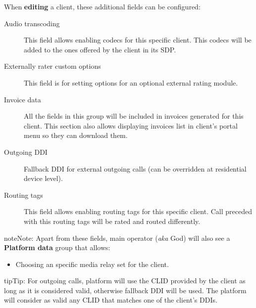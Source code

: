 \documentclass[letterpaper,10pt,english]{sphinxmanual}
\begin{document}
When \textbf{editing} a client, these additional fields can be configured:
\begin{description}
\item[{Audio transcoding}] \leavevmode{}\label{administration_portal/brand/clients/retail:term-audio-transcoding}
This field allows enabling codecs for this specific client. This codecs will be added to
the ones offered by the client in its SDP.

\item[{Externally rater custom options}] \leavevmode{}\label{administration_portal/brand/clients/retail:term-externally-rater-custom-options}
This field is for setting options for an optional external rating module.

\item[{Invoice data}] \leavevmode{}\label{administration_portal/brand/clients/retail:term-invoice-data}
All the fields in this group will be included in invoices generated for this client. This section also allows
displaying invoices list in client's portal menu so they can download them.

\item[{Outgoing DDI}] \leavevmode{}\label{administration_portal/brand/clients/retail:term-outgoing-ddi}
Fallback DDI for external outgoing calls (can be overridden at residential device level).

\item[{Routing tags}] \leavevmode{}\label{administration_portal/brand/clients/retail:term-routing-tags}
This field allows enabling routing tags for this specific client. Call preceded with this
routing tags will be rated and routed differently.

\end{description}

\begin{notice}{note}{Note:}
Apart from these fields, main operator (\emph{aka} God) will also see a \textbf{Platform data} group that allows:
\begin{itemize}
\item {} 
Choosing an specific media relay set for the client.

\end{itemize}
\end{notice}

\begin{notice}{tip}{Tip:}
For outgoing calls, platform will use the CLID provided by the client as long as it is considered valid, otherwise fallback DDI
will be used. The platform will consider as valid any CLID that matches one of the client's DDIs.
\end{notice}
\end{document}
